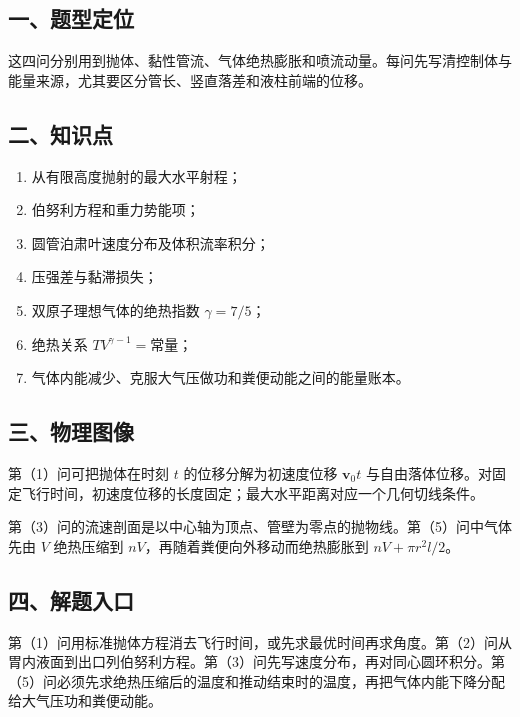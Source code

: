 \documentclass[12pt,a4paper,UTF8]{ctexart}
\newcommand{\tightlist}{\setlength{\itemsep}{0pt}\setlength{\parskip}{0pt}}
\begin{document}
\subsection{一、题型定位}\label{ux4e00ux9898ux578bux5b9aux4f4d-4}

这四问分别用到抛体、黏性管流、气体绝热膨胀和喷流动量。每问先写清控制体与能量来源，尤其要区分管长、竖直落差和液柱前端的位移。

\subsection{二、知识点}\label{ux4e8cux77e5ux8bc6ux70b9-4}

\begin{enumerate}
\def\labelenumi{\arabic{enumi}.}
\tightlist
\item
  从有限高度抛射的最大水平射程；
\item
  伯努利方程和重力势能项；
\item
  圆管泊肃叶速度分布及体积流率积分；
\item
  压强差与黏滞损失；
\item
  双原子理想气体的绝热指数 \(\gamma=7/5\)；
\item
  绝热关系 \(TV^{\gamma-1}=\text{常量}\)；
\item
  气体内能减少、克服大气压做功和粪便动能之间的能量账本。
\end{enumerate}

\subsection{三、物理图像}\label{ux4e09ux7269ux7406ux56feux50cf-4}

第（1）问可把抛体在时刻 \(t\) 的位移分解为初速度位移 \(\bm v_0t\)
与自由落体位移。对固定飞行时间，初速度位移的长度固定；最大水平距离对应一个几何切线条件。

第（3）问的流速剖面是以中心轴为顶点、管壁为零点的抛物线。第（5）问中气体先由
\(V\) 绝热压缩到 \(nV\)，再随着粪便向外移动而绝热膨胀到
\(nV+\pi r^2l/2\)。

\subsection{四、解题入口}\label{ux56dbux89e3ux9898ux5165ux53e3-4}

第（1）问用标准抛体方程消去飞行时间，或先求最优时间再求角度。第（2）问从胃内液面到出口列伯努利方程。第（3）问先写速度分布，再对同心圆环积分。第（5）问必须先求绝热压缩后的温度和推动结束时的温度，再把气体内能下降分配给大气压功和粪便动能。
\end{document}
